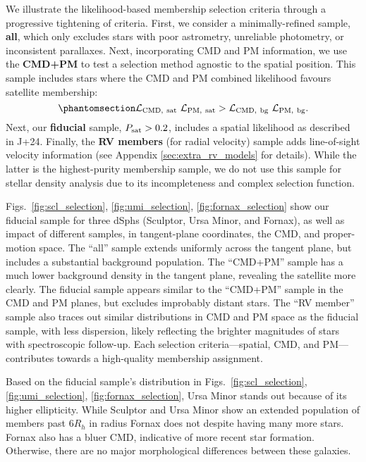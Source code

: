 We illustrate the likelihood-based membership selection criteria through
a progressive tightening of criteria. First, we consider a
minimally-refined sample, \textbf{all}, which only excludes stars with
poor astrometry, unreliable photometry, or inconsistent parallaxes.
Next, incorporating CMD and PM information, we use the \textbf{CMD+PM}
to test a selection method agnostic to the spatial position. This sample
includes stars where the CMD and PM combined likelihood favours
satellite membership:
\begin{equation}\protect\phantomsection\label{eq:sel_cmd_pm}{
{\cal L}_{\rm CMD,\ sat}\ {\cal L}_{\rm PM,\ sat} > {\cal L}_{\rm CMD,\ bg}\ {\cal L}_{\rm PM,\ bg}.
}\end{equation} Next, our \textbf{fiducial} sample,
\(P_{\rm sat} > 0.2\), includes a spatial likelihood as described in
J+24. Finally, the \textbf{RV members} (for radial velocity) sample adds
line-of-sight velocity information (see Appendix
\ref{sec:extra_rv_models} for details). While the latter is the
highest-purity membership sample, we do not use this sample for stellar
density analysis due to its incompleteness and complex selection
function.

Figs.~\ref{fig:scl_selection}, \ref{fig:umi_selection}, \ref{fig:fornax_selection}
show our fiducial sample for three dSphs (Sculptor, Ursa Minor, and
Fornax), as well as impact of different samples, in tangent-plane
coordinates, the CMD, and proper-motion space. The ``all'' sample
extends uniformly across the tangent plane, but includes a substantial
background population. The ``CMD+PM'' sample has a much lower background
density in the tangent plane, revealing the satellite more clearly. The
fiducial sample appears similar to the ``CMD+PM'' sample in the CMD and
PM planes, but excludes improbably distant stars. The ``RV member''
sample also traces out similar distributions in CMD and PM space as the
fiducial sample, with less dispersion, likely reflecting the brighter
magnitudes of stars with spectroscopic follow-up. Each selection
criteria---spatial, CMD, and PM---contributes towards a high-quality
membership assignment.

Based on the fiducial sample's distribution in
Figs.~\ref{fig:scl_selection}, \ref{fig:umi_selection}, \ref{fig:fornax_selection},
Ursa Minor stands out because of its higher ellipticity. While Sculptor
and Ursa Minor show an extended population of members past \(6R_h\) in
radius Fornax does not despite having many more stars. Fornax also has a
bluer CMD, indicative of more recent star formation. Otherwise, there
are no major morphological differences between these galaxies.


